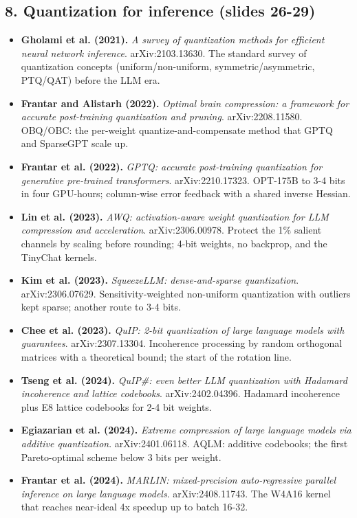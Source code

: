\documentclass[11pt,letterpaper]{article}
\begin{document}
\subsection*{8. Quantization for inference (slides 26-29)}
\begin{itemize}[leftmargin=1.2em,itemsep=3pt]\sloppy
\item \textbf{Gholami et al. (2021).} \textit{A survey of quantization methods for efficient neural network inference}. arXiv:2103.13630. The standard survey of quantization concepts (uniform/non-uniform, symmetric/asymmetric, PTQ/QAT) before the LLM era.
\item \textbf{Frantar and Alistarh (2022).} \textit{Optimal brain compression: a framework for accurate post-training quantization and pruning}. arXiv:2208.11580. OBQ/OBC: the per-weight quantize-and-compensate method that GPTQ and SparseGPT scale up.
\item \textbf{Frantar et al. (2022).} \textit{GPTQ: accurate post-training quantization for generative pre-trained transformers}. arXiv:2210.17323. OPT-175B to 3-4 bits in four GPU-hours; column-wise error feedback with a shared inverse Hessian.
\item \textbf{Lin et al. (2023).} \textit{AWQ: activation-aware weight quantization for LLM compression and acceleration}. arXiv:2306.00978. Protect the 1\% salient channels by scaling before rounding; 4-bit weights, no backprop, and the TinyChat kernels.
\item \textbf{Kim et al. (2023).} \textit{SqueezeLLM: dense-and-sparse quantization}. arXiv:2306.07629. Sensitivity-weighted non-uniform quantization with outliers kept sparse; another route to 3-4 bits.
\item \textbf{Chee et al. (2023).} \textit{QuIP: 2-bit quantization of large language models with guarantees}. arXiv:2307.13304. Incoherence processing by random orthogonal matrices with a theoretical bound; the start of the rotation line.
\item \textbf{Tseng et al. (2024).} \textit{QuIP\#: even better LLM quantization with Hadamard incoherence and lattice codebooks}. arXiv:2402.04396. Hadamard incoherence plus E8 lattice codebooks for 2-4 bit weights.
\item \textbf{Egiazarian et al. (2024).} \textit{Extreme compression of large language models via additive quantization}. arXiv:2401.06118. AQLM: additive codebooks; the first Pareto-optimal scheme below 3 bits per weight.
\item \textbf{Frantar et al. (2024).} \textit{MARLIN: mixed-precision auto-regressive parallel inference on large language models}. arXiv:2408.11743. The W4A16 kernel that reaches near-ideal 4x speedup up to batch 16-32.

\end{itemize}
\end{document}
